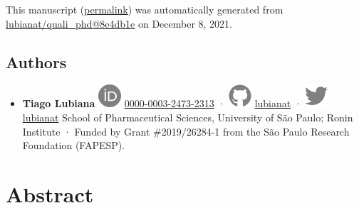 This manuscript
(\href{https://lubianat.github.io/quali_phd/v/8e4db1e93b09d5722f9c3655e461f238c65e0391/}{permalink})
was automatically generated
from \href{https://github.com/lubianat/quali_phd/tree/8e4db1e93b09d5722f9c3655e461f238c65e0391}{lubianat/quali\_phd@8e4db1e}
on December 8, 2021.

\hypertarget{authors}{%
\subsection{Authors}\label{authors}}

\begin{itemize}
\tightlist
\item
  \textbf{Tiago Lubiana}
  \includegraphics{images/orcid.svg}
  \href{https://orcid.org/0000-0003-2473-2313}{0000-0003-2473-2313}
  · \includegraphics{images/github.svg}
  \href{https://github.com/lubianat}{lubianat}
  · \includegraphics{images/twitter.svg}
  \href{https://twitter.com/lubianat}{lubianat}
  School of Pharmaceutical Sciences, University of São Paulo; Ronin Institute
  · Funded by Grant \#2019/26284-1 from the São Paulo Research Foundation (FAPESP).
\end{itemize}

\hypertarget{abstract}{%
\section{Abstract}\label{abstract}}

